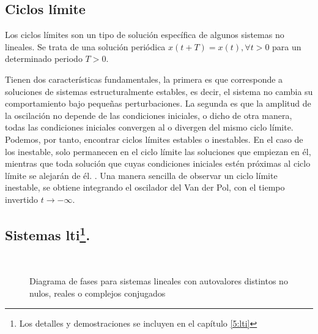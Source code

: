 \subsection{Ciclos límite}
Los ciclos límites son un tipo de solución específica de algunos sistemas no lineales. Se trata de una solución periódica $x(t+T) =x(t), \forall t>0$ para un determinado periodo  $T>0$. 

Tienen dos características fundamentales, la primera es que corresponde a soluciones de sistemas estructuralmente estables, es decir, el sistema no cambia su comportamiento bajo pequeñas perturbaciones. La segunda es que la amplitud de la oscilación no depende de las condiciones iniciales, o dicho  de otra manera, todas las condiciones iniciales convergen al o divergen del mismo ciclo límite. Podemos, por tanto, encontrar ciclos límites estables o inestables. En el caso de los inestable, solo permanecen en el ciclo límite las soluciones que empiezan en él, mientras que toda solución que cuyas condiciones iniciales estén próximas al ciclo límite se alejarán de él. . Una manera sencilla de observar un ciclo límite inestable, se obtiene integrando el oscilador del Van der Pol, con el tiempo invertido $t\to -\infty$.





\subsection{Sistemas lti\protect\footnote{Los detalles y demostraciones se incluyen en el capítulo \ref{5:lti}}. }

\begin{figure}[ht] 
\\
\caption{Diagrama de fases para sistemas lineales con autovalores distintos no nulos, reales o complejos conjugados}\label{fig:lin1}
\end{figure}

